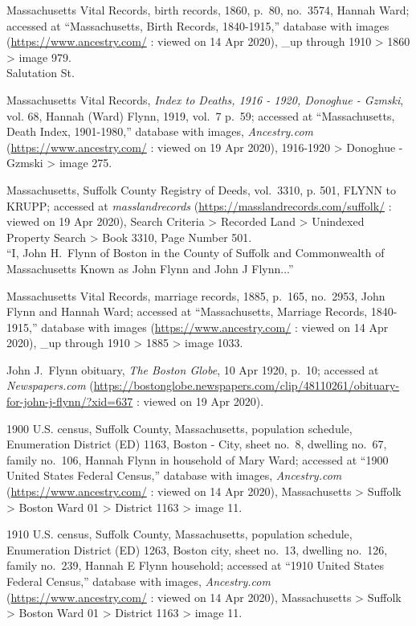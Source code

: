 \begin{thebibliography}{99}
	Massachusetts Vital Records, birth records, 1860, p.\ 80, no.\ 3574, Hannah Ward; accessed at ``Massachusetts, Birth Records, 1840-1915,'' database with images (\url{https://www.ancestry.com/} : viewed on 14 Apr 2020), \_up through 1910 > 1860 > image 979.\\
	Salutation St.
	
	Massachusetts Vital Records, \textit{Index to Deaths, 1916 - 1920, Donoghue - Gzmski}, vol. 68, Hannah (Ward) Flynn, 1919, vol.\ 7 p.\ 59; accessed at ``Massachusetts, Death Index, 1901-1980,'' database with images, \textit{Ancestry.com} (\url{https://www.ancestry.com/} : viewed on 19 Apr 2020), 1916-1920 > Donoghue - Gzmski > image 275.
	
	Massachusetts, Suffolk County Registry of Deeds, vol.\ 3310, p. 501, FLYNN to KRUPP; accessed at \textit{masslandrecords} (\url{https://masslandrecords.com/suffolk/} : viewed on 19 Apr 2020), Search Criteria >  Recorded Land > Unindexed Property Search > Book 3310, Page Number 501.\\
	``I, John H.\ Flynn of Boston in the County of Suffolk and Commonwealth of Massachusetts Known as John Flynn and John J Flynn...''
	
	Massachusetts Vital Records, marriage records, 1885, p.\ 165, no.\ 2953, John Flynn and Hannah Ward; accessed at ``Massachusetts, Marriage Records, 1840-1915,'' database with images (\url{https://www.ancestry.com/} : viewed on 14 Apr 2020), \_up through 1910 > 1885 > image 1033.
		
	John J.\ Flynn obituary, \textit{The Boston Globe}, 10 Apr 1920, p.\ 10; accessed at \textit{Newspapers.com} (\url{https://bostonglobe.newspapers.com/clip/48110261/obituary-for-john-j-flynn/?xid=637} : viewed on 19 Apr 2020).
	
	1900 U.S. census, Suffolk County, Massachusetts, population schedule, Enumeration District (ED) 1163, Boston - City, sheet no.\ 8, dwelling no.\ 67, family no.\ 106, Hannah Flynn in household of Mary Ward; accessed at ``1900 United States Federal Census,'' database with images, \textit{Ancestry.com} (\url{https://www.ancestry.com/} : viewed on 14 Apr 2020), Massachusetts > Suffolk > Boston Ward 01 > District 1163 > image 11.	
	
	1910 U.S. census, Suffolk County, Massachusetts, population schedule, Enumeration District (ED) 1263, Boston city, sheet no.\ 13, dwelling no.\ 126, family no.\ 239, Hannah E Flynn household; accessed at ``1910 United States Federal Census,'' database with images, \textit{Ancestry.com} (\url{https://www.ancestry.com/} : viewed on 14 Apr 2020), Massachusetts > Suffolk > Boston Ward 01 > District 1163 > image 11.
	

\end{thebibliography}
